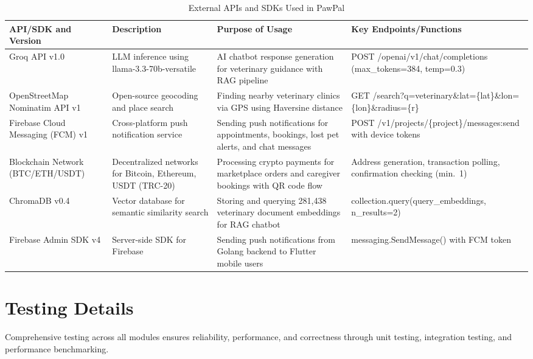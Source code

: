 \begin{table}[H]
\centering
\caption{External APIs and SDKs Used in PawPal}
\label{tab:external_apis}
\begin{tabularx}{\textwidth}{|>{\raggedright\arraybackslash}p{2.5cm}|>{\raggedright\arraybackslash}X|>{\raggedright\arraybackslash}X|>{\raggedright\arraybackslash}X|}
\hline
\textbf{API/SDK and Version} & \textbf{Description} & \textbf{Purpose of Usage} & \textbf{Key Endpoints/Functions} \\ \hline
Groq API v1.0 & LLM inference using llama-3.3-70b-versatile & AI chatbot response generation for veterinary guidance with RAG pipeline & POST /openai/v1/chat/completions (max\_tokens=384, temp=0.3) \\ \hline
OpenStreetMap Nominatim API v1 & Open-source geocoding and place search & Finding nearby veterinary clinics via GPS using Haversine distance & GET /search?q=veterinary\&lat=\{lat\}\&lon=\{lon\}\&radius=\{r\} \\ \hline
Firebase Cloud Messaging (FCM) v1 & Cross-platform push notification service & Sending push notifications for appointments, bookings, lost pet alerts, and chat messages & POST /v1/projects/\{project\}/messages:send with device tokens \\ \hline
Blockchain Network (BTC/ETH/USDT) & Decentralized networks for Bitcoin, Ethereum, USDT (TRC-20) & Processing crypto payments for marketplace orders and caregiver bookings with QR code flow & Address generation, transaction polling, confirmation checking (min.\ 1) \\ \hline
ChromaDB v0.4 & Vector database for semantic similarity search & Storing and querying 281,438 veterinary document embeddings for RAG chatbot & collection.query(query\_embeddings, n\_results=2) \\ \hline
Firebase Admin SDK v4 & Server-side SDK for Firebase & Sending push notifications from Golang backend to Flutter mobile users & messaging.SendMessage() with FCM token \\ \hline
\end{tabularx}
\end{table}

\section{Testing Details}
Comprehensive testing across all modules ensures reliability, performance, and correctness through unit testing, integration testing, and performance benchmarking.

